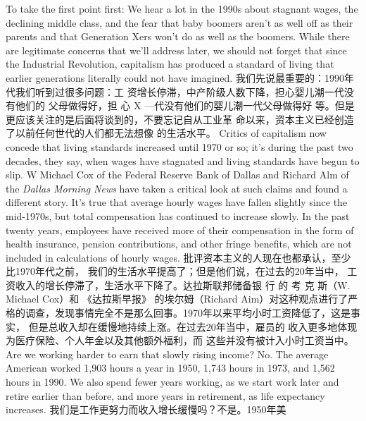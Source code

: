 \begin{paracol}{2}
To take the first point first: We hear a lot in the 1990s about
stagnant wages, the declining middle class, and the fear that
baby boomers aren't as well off as their parents and that Generation Xers won't do as well as the boomers. While there are legitimate concerns that we'll address later, we should not forget
that since the Industrial Revolution, capitalism has produced a
standard of living that earlier generations literally could not
have imagined.
\switchcolumn
我们先说最重要的：1990年代我们听到过很多问题：工
资增长停滞，中产阶级人数下降，担心婴儿潮一代没有他们的
父母做得好，担 心 X ---代没有他们的婴儿潮一代父母做得好
等。但是更应该关注的是后面将谈到的，不要忘记自从工业革
命以来，资本主义已经创造了以前任何世代的人们都无法想像
的生活水平。
\switchcolumn*
Critics of capitalism now concede that living standards increased until 1970 or so; it's during the past two decades, they
say, when wages have stagnated and living standards have
begun to slip. W Michael Cox of the Federal Reserve Bank of
Dallas and Richard Alm of the \textit{Dallas Morning News} have taken
a critical look at such claims and found a different story. It's true
that average hourly wages have fallen slightly since the mid-1970s, but total compensation has continued to increase slowly.
In the past twenty years, employees have received more of their
compensation in the form of health insurance, pension contributions, and other fringe benefits, which are not included in
calculations of hourly wages.
\switchcolumn
批评资本主义的人现在也都承认，至少比1970年代之前，
我们的生活水平提高了；但是他们说，在过去的20年当中，
工资收入的增长停滞了，生活水平下降了。达拉斯联邦储备银
行 的 考 克 斯（W. Michael Cox）和 《达拉斯早报》 的埃尔姆（Richard Aim）对这种观点进行了严格的调查，发现事情完全不是那么回事。1970年以来平均小时工资降低了，这是事实，
但是总收入却在缓慢地持续上涨。在过去20年当中，雇员的
收入更多地体现为医疗保险、个人年金以及其他额外福利，而
这些并没有被计入小时工资当中。
\switchcolumn*
Are we working harder to earn that slowly rising income?
No. The average American worked 1,903 hours a year in 1950,
1,743 hours in 1973, and 1,562 hours in 1990. We also spend
fewer years working, as we start work later and retire earlier
than before, and more years in retirement, as life expectancy increases.
\switchcolumn
我们是工作更努力而收入增长缓慢吗？不是。1950年美

\end{paracol}
